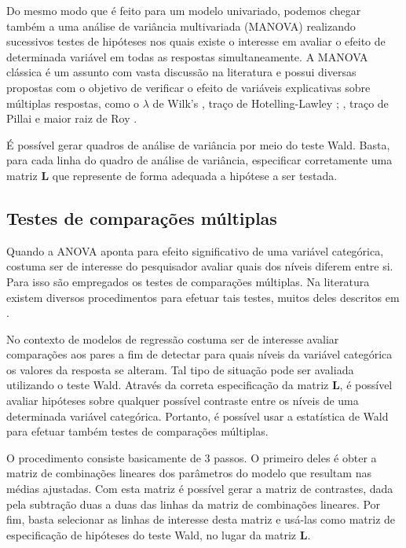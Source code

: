 Do mesmo modo que é feito para um modelo univariado, podemos chegar também a uma análise de variância multivariada (MANOVA) realizando sucessivos testes de hipóteses nos quais existe o interesse em avaliar o efeito de determinada variável em todas as respostas simultaneamente. A MANOVA clássica \citep{manova} é um assunto com vasta discussão na literatura e possui diversas propostas com o objetivo de verificar o efeito de variáveis explicativas sobre múltiplas respostas, como o $\lambda$ de Wilk's \citep{wilks}, traço de Hotelling-Lawley \citep{lawley}; \citep{hotelling}, traço de Pillai \citep{pillai} e maior raiz de Roy \citep{roy}. 

É possível gerar quadros de análise de variância por meio do teste Wald. Basta, para cada linha do quadro de análise de variância, especificar corretamente uma matriz $\boldsymbol{L}$ que represente de forma adequada a hipótese a ser testada.

\subsection{Testes de comparações múltiplas}

Quando a ANOVA aponta para efeito significativo de uma variável categórica, costuma ser de interesse do pesquisador avaliar quais dos níveis diferem entre si. Para isso são empregados os testes de comparações múltiplas. Na literatura existem diversos procedimentos para efetuar tais testes, muitos deles descritos em \citet{hsu1996multiple}.

No contexto de modelos de regressão costuma ser de interesse avaliar comparações aos pares a fim de detectar para quais níveis da variável categórica os valores da resposta se alteram. Tal tipo de situação pode ser avaliada utilizando o teste Wald. Através da correta especificação da matriz $\boldsymbol{L}$, é possível avaliar hipóteses sobre qualquer possível contraste entre os níveis de uma determinada variável categórica. Portanto, é possível usar a estatística de Wald para efetuar também testes de comparações múltiplas.

O procedimento consiste basicamente de 3 passos. O primeiro deles é obter a matriz de combinações lineares dos parâmetros do modelo que resultam nas médias ajustadas. Com esta matriz é possível gerar a matriz de contrastes, dada pela subtração duas a duas das linhas da matriz de combinações lineares. Por fim, basta selecionar as linhas de interesse desta matriz e usá-las como matriz de especificação de hipóteses do teste Wald, no lugar da matriz $\boldsymbol{L}$.
	
